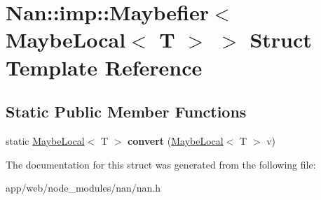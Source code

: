 \hypertarget{struct_nan_1_1imp_1_1_maybefier_3_01_maybe_local_3_01_t_01_4_01_4}{}\section{Nan\+:\+:imp\+:\+:Maybefier$<$ Maybe\+Local$<$ T $>$ $>$ Struct Template Reference}
\label{struct_nan_1_1imp_1_1_maybefier_3_01_maybe_local_3_01_t_01_4_01_4}
\subsection*{Static Public Member Functions}
\begin{DoxyCompactItemize}
\item 
\mbox{\label{struct_nan_1_1imp_1_1_maybefier_3_01_maybe_local_3_01_t_01_4_01_4_abcf6237fe492fa2c8544c9b6f3d7e4ad}} 
static \hyperlink{class_nan_1_1_maybe_local}{Maybe\+Local}$<$ T $>$ {\bfseries convert} (\hyperlink{class_nan_1_1_maybe_local}{Maybe\+Local}$<$ T $>$ v)
\end{DoxyCompactItemize}


The documentation for this struct was generated from the following file\+:\begin{DoxyCompactItemize}
\item 
app/web/node\+\_\+modules/nan/nan.\+h\end{DoxyCompactItemize}
